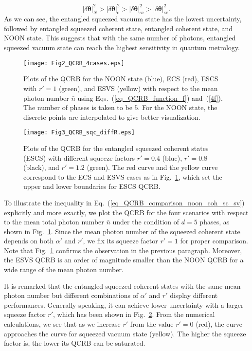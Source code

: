 \documentclass[aps,pra,reprint,showpacs,groupedaddress]{revtex4-1}
\begin{document}
\begin{equation}
    |\delta\boldsymbol{\theta}|_{N}^2 > |\delta\boldsymbol{\theta}|_{\text{c}}^2 > |\delta\boldsymbol{\theta}|_{\text{sc}}^2 > |\delta\boldsymbol{\theta}|_{\text{sv}}^2.
    \label{eq_QCRB_comparison_noon_coh_sc_sv}
\end{equation}
As we can see, the entangled squeezed vacuum state has the lowest uncertainty, followed by entangled squeezed coherent state, entangled coherent state, and NOON state. This suggests that with the same number of photons, entangled squeezed vacuum state can reach the highest sensitivity in quantum metrology.



\begin{figure}[!t]
\centering
\texttt{[image: Fig2\_QCRB\_4cases.eps]}
\caption{Plots of the QCRB for the NOON state (blue), ECS (red), ESCS with $r'=1$ (green), and ESVS (yellow) with respect to the mean photon number $\bar{n}$ using Eqs.~(\ref{eq_QCRB_function_f}) and~(\ref{4f}).
The number of phases is taken to be $5$. For the NOON state, the discrete points are interpolated to give better visualization.
}
\label{Fig1_QCRB_4cases}
\end{figure}

\begin{figure}[!t]
\centering
\texttt{[image: Fig3\_QCRB\_sqc\_diffR.eps]}
\caption{Plots of the QCRB for the entangled squeezed coherent states (ESCS) with different squeeze factors $r'=0.4$ (blue), $r'=0.8$ (black), and $r'=1.2$ (green). The red curve and the yellow curve correspond to the ECS and ESVS cases as in Fig.~\ref{Fig1_QCRB_4cases}, which set the upper and lower boundaries for ESCS QCRB.
}
\label{Fig2_QCRB_sc_differentR}
\end{figure}


To illustrate the inequality in Eq.~(\ref{eq_QCRB_comparison_noon_coh_sc_sv}) explicitly and more exactly, we plot the QCRB for the four scenarios with respect to the mean total photon number $\bar{n}$ under the condition of $d=5$ phases, as shown in Fig.~\ref{Fig1_QCRB_4cases}. Since the mean photon number of the squeezed coherent state depends on both $\alpha'$ and $r'$, we fix its squeeze factor $r'=1$ for proper comparison.  Note that Fig.~\ref{Fig1_QCRB_4cases} confirms the observation in the previous paragraph.  Moreover, the ESVS QCRB is an order of magnitude smaller than the NOON QCRB for a wide range of the mean photon number.


It is remarked that the entangled squeezed coherent states with the same mean photon number but different combinations of $\alpha'$ and $r'$ display different performances.  Generally speaking, it can achieve lower uncertainty with a larger squeeze factor $r'$, which has been shown in Fig.~\ref{Fig2_QCRB_sc_differentR}.
From the numerical calculations, we see that as we increase $r'$ from the value $r'=0$ (red), the curve approaches the curve for squeezed vacuum state (yellow). The higher the squeeze factor is, the lower its QCRB can be saturated.
\end{document}
